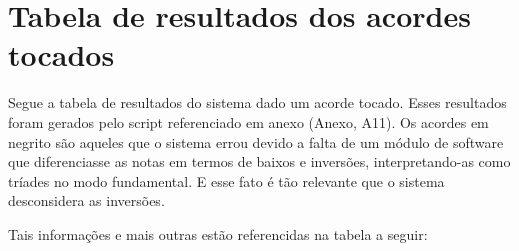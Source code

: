 \section{Tabela de resultados dos acordes tocados}
\label{sec:tabelaacordestocados}
Segue a tabela de resultados do sistema dado um acorde tocado. Esses resultados foram gerados pelo script referenciado em anexo (Anexo, A11). Os acordes em negrito são aqueles que o sistema errou devido a falta de um módulo de software que diferenciasse as notas em termos de baixos e inversões, interpretando-as como tríades no modo fundamental. E esse fato é tão relevante que o sistema desconsidera as inversões.

Tais informações e mais outras estão referencidas na tabela a seguir:

\begin{table}[ht!]
 \centering
\end{table}
